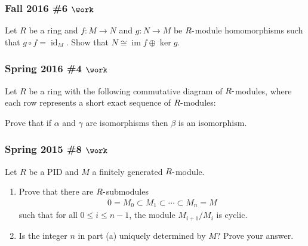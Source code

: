 \hypertarget{fall-2016-6-work}{%
\subsubsection{\texorpdfstring{Fall 2016 \#6
\(\work\)}{Fall 2016 \#6 \textbackslash work}}\label{fall-2016-6-work}}

Let \(R\) be a ring and \(f: M\to N\) and \(g: N\to M\) be
\(R{\hbox{-}}\)module homomorphisms such that
\(g\circ f = \operatorname{id}_M\). Show that
\(N\cong \operatorname{im}f \oplus \ker g\).

\hypertarget{spring-2016-4-work}{%
\subsubsection{\texorpdfstring{Spring 2016 \#4
\(\work\)}{Spring 2016 \#4 \textbackslash work}}\label{spring-2016-4-work}}

Let \(R\) be a ring with the following commutative diagram of
\(R{\hbox{-}}\)modules, where each row represents a short exact sequence
of \(R{\hbox{-}}\)modules:

\begin{center}
\end{center}

Prove that if \(\alpha\) and \(\gamma\) are isomorphisms then \(\beta\)
is an isomorphism.

\hypertarget{spring-2015-8-work}{%
\subsubsection{\texorpdfstring{Spring 2015 \#8
\(\work\)}{Spring 2015 \#8 \textbackslash work}}\label{spring-2015-8-work}}

Let \(R\) be a PID and \(M\) a finitely generated \(R{\hbox{-}}\)module.

\begin{enumerate}
\def\labelenumi{\alph{enumi}.}
\item
  Prove that there are \(R{\hbox{-}}\)submodules
  \begin{align*}
  0 = M_0 \subset M_1 \subset \cdots \subset M_n = M
  \end{align*}
  such that for all \(0\leq i \leq n-1\), the module \(M_{i+1}/M_i\) is
  cyclic.
\item
  Is the integer \(n\) in part (a) uniquely determined by \(M\)? Prove
  your answer.
\end{enumerate}

